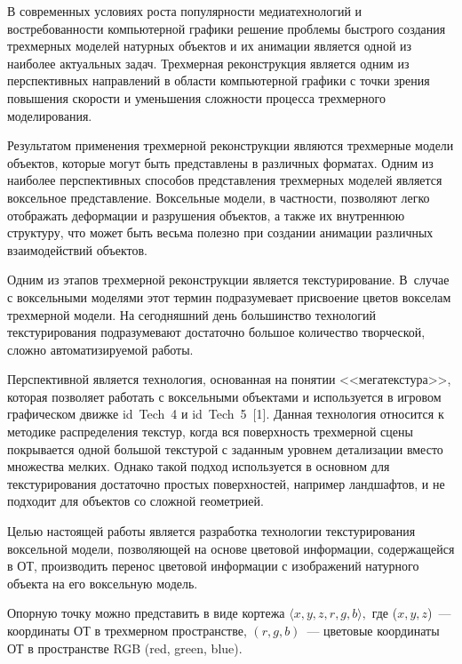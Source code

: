 \begin{multicols}{2}

\label{st\stat}



    В современных условиях роста популярности медиатехнологий и
востребованности компьютерной графики решение проблемы быстрого
создания трехмерных моделей натурных объектов и их анимации является
одной из наиболее актуальных задач. Трехмерная реконструкция является
одним из перспективных направлений в области компьютерной графики с
точки зрения повышения скорости и уменьшения сложности процесса
трехмерного моделирования.

   Результатом применения трехмерной реконструкции являются
трехмерные модели объектов, которые могут быть представлены в
различных форматах.
%
Одним из наиболее перспективных способов
представления трехмерных моделей является воксельное представление.
Воксельные модели, в частности, позволяют легко отображать деформации и
разрушения объектов, а также их внутреннюю структуру, что может быть
весьма полезно при создании анимации различных взаимодействий объектов.

  Одним из этапов трехмерной реконструкции является текстурирование.
В~случае с воксельными моделями этот термин подразумевает присвоение
цветов вокселам трехмерной модели. На сегодняшний день большинство
технологий текстурирования подразумевают достаточно большое количество
творческой, сложно автоматизируемой работы.

  Перспективной является технология, основанная на понятии
<<мегатекстура>>, которая позволяет работать с воксельными объектами и
используется в игровом графическом движке id~Tech~4 и id~Tech~5~[1].
Данная технология относится к методике распределения текстур, когда вся
поверхность трехмерной сцены покрывается одной большой текстурой с
заданным уровнем детализации вместо множества мелких. Однако такой
подход используется в основном для текстурирования достаточно прос\-тых
поверхностей, например ландшафтов, и не подходит для объектов со
сложной геометрией.

  Целью настоящей работы является разработка технологии
текстурирования воксельной модели, позволяющей на основе цветовой
информации, содержащейся в ОТ, производить перенос цветовой
информации с изображений натурного объекта на его воксельную модель.

  Опорную точку можно представить в виде кортежа
  $  \langle x, y, z, r, g, b\rangle,$
где ($x, y, z$)~--- координаты ОТ в трехмерном пространстве, $(r, g, b)$~---
цветовые координаты ОТ в пространстве RGB (red, green, blue).
{

}
\end{multicols}
